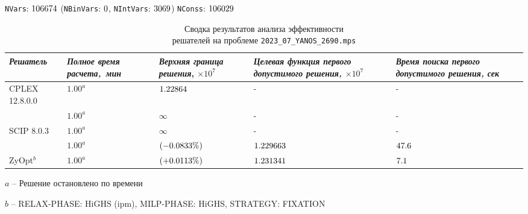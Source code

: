\documentclass[%
	11pt,
	a4paper,
	utf8,
		]{article}
\begin{document}
{
	\begin{table}[!h]
		\centering
		\caption{Сводка результатов анализа эффективности \\решателей на проблеме \texttt{2023\_07\_YANOS\_2690.mps}}
		
		{\footnotesize \texttt{NVars}: $ 106674 $ (\texttt{NBinVars}: $ 0 $,  \texttt{NIntVars}: $ 3069 $) \texttt{NConss}: $ 106029 $}\\[2mm]
		
		\begin{tabular}{ p{2.7cm} p{2.5cm} p{3.6cm} p{3.6cm} p{3.2cm} }
			\rowcolor{black!5}\emph{Решатель} & \emph{Полное время \mbox{расчета, мин}} & \emph{Верхняя граница} \mbox{\itshape решения}, $ \times 10^{7} $ & \emph{Целевая функция первого допустимого решения, $ \times 10^7 $} & \emph{Время поиска первого допустимого решения, сек} \\
			\hline
			{CPLEX 12.8.0.0} & $ 1.00^a $ & $ \fpeval{trunc(\cplexObjA, 6)} $ & - & -\\
			\rowcolor{black!5}{CBC} & $ 1.00^a $ & $ \infty $ & - & - \\
			{SCIP 8.0.3} & $ 1.00^a $ & $ \infty $ & - & - \\
			\rowcolor{black!5}{HiGHS 1.5.3} & $ 1.00^a $ & \ccr{$ \ccr{\fpeval{trunc(\highsObjA, 6)}} $} $ (\fpeval{trunc(\cplexHighsObjRelA, 4)}\%) $ & $ \fpeval{trunc(\firstSolHighsObjA, 6)} $ & $ \fpeval{\firstSolHighsTimeA} $ \\
			ZyOpt$^b$ & $ 1.00^a $  & \ccb{$ \fpeval{trunc(\zyoptObjA, 6)} $} $ (+\fpeval{trunc(\cplexZyoptObjRelA, 4)}\%) $ & $ \fpeval{trunc(\firstSolZyoptObjA, 6)} $ & $ \fpeval{\firstSolZyoptTimeA} $ \\
		\end{tabular}
	\end{table}
\vspace*{-3mm}
\hspace*{5mm}$ a $ -- {\footnotesize Решение остановлено по времени}

\hspace*{5mm}$ b $ -- {\footnotesize RELAX-PHASE: HiGHS (ipm), MILP-PHASE: HiGHS, STRATEGY: FIXATION}
}







\def\NVarsB{89608}
\def\NBinVarsB{0}
\def\NIntVarsB{2480}
\def\NConssB{87714}
\end{document}
